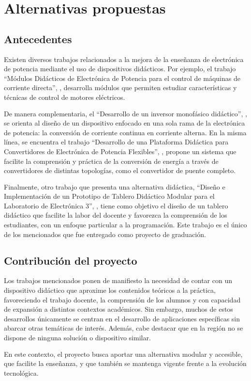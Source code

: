 \section{Alternativas propuestas}
\justifying

\subsection{Antecedentes}

Existen diversos trabajos relacionados a la mejora de la enseñanza de electrónica de potencia mediante el uso de dispositivos didácticos. Por ejemplo, el trabajo ``Módulos Didácticos de Electrónica de Potencia para el control de máquinas de corriente directa'', \parencite{4915257}, desarrolla módulos que permiten estudiar características y técnicas de control de motores eléctricos. 

De manera complementaria, el ``Desarrollo de un inversor monofásico didáctico'', \parencite{SANDOVAL-INVERSOR}, se orienta al diseño de un dispositivo enfocado en una sola rama de la electrónica de potencia: la conversión de corriente continua en corriente alterna. En la misma línea, se encuentra el trabajo ``Desarrollo de una Plataforma Didáctica para Convertidores de Electrónica de Potencia Flexibles'', \parencite{VictorGuimarFra2022}, propone un sistema que facilite la comprensión y práctica de la conversión de energía a través de convertidores de distintas topologías, como el convertidor de puente completo.

Finalmente, otro trabajo que presenta una alternativa didáctica, ``Diseño e Implementación de un Prototipo de Tablero Didáctico Modular para el Laboratorio de Electrónica 3'', \parencite{ALVAREZ-TESIS}, tiene como objetivo el diseño de un tablero didáctico que facilite la labor del docente y favorezca la comprensión de los estudiantes, con un enfoque particular a la programación. Este trabajo es el único de los mencionados que fue entregado como proyecto de graduación.

\subsection{Contribución del proyecto}

Los trabajos mencionados ponen de manifiesto la necesidad de contar con un dispositivo didáctico que aproxime los contenidos teóricos a la práctica, favoreciendo el trabajo docente, la comprensión de los alumnos y con capacidad de expansión a distintos contextos académicos. Sin embargo, muchos de estos desarrollos únicamente se centran en el desarrollo de aplicaciones específicas sin abarcar otras temáticas de interés. Además, cabe destacar que en la región no se dispone de ninguna solución o dispositivo similar. 

En este contexto, el proyecto busca aportar una alternativa modular y accesible, que facilite la enseñanza, y que también se mantenga vigente frente a la evolución tecnológica. 